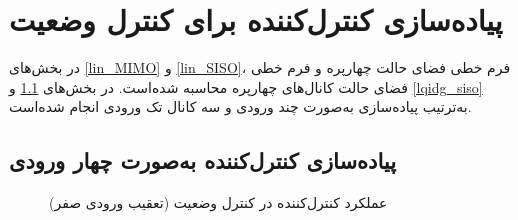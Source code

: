 \section{پیاده‌سازی کنترل‌کننده برای کنترل وضعیت}\label{3DOF_lqidg_section}
در بخش‌های
\ref{lin_MIMO}
و
\ref{lin_SISO}،
فرم خطی فضای حالت چهارپره و فرم خطی فضای حالت کانال‌های چهارپره محاسبه شده‌است. در بخش‌های
\ref{lqidg_mimo}
و
\ref{lqidg_siso}
به‌ترتیب پیاده‌سازی به‌صورت چند ورودی و سه کانال تک ورودی انجام شده‌است.



\subsection{پیاده‌سازی کنترل‌کننده به‌صورت چهار ورودی}\label{lqidg_mimo}


\begin{figure}[H]
	\centering
	\caption{‫‪عملکرد کنترل‌کننده  در کنترل وضعیت (تعقیب ورودی صفر)}
\end{figure}



